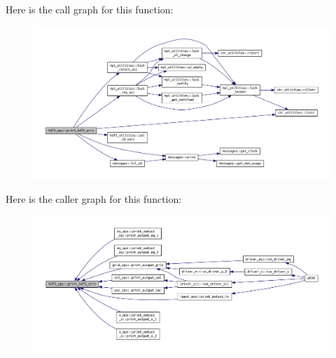 Here is the call graph for this function\+:\nopagebreak
\begin{figure}[H]
\begin{center}
\leavevmode
\includegraphics[width=350pt]{namespacehdf5__ops_af80b879ed614698ed91b8235cf1cb22a_cgraph}
\end{center}
\end{figure}
Here is the caller graph for this function\+:\nopagebreak
\begin{figure}[H]
\begin{center}
\leavevmode
\includegraphics[width=350pt]{namespacehdf5__ops_af80b879ed614698ed91b8235cf1cb22a_icgraph}
\end{center}
\end{figure}
\mbox{\label{namespacehdf5__ops_a4d0ba813f369f904a9e991804662d099}} 
